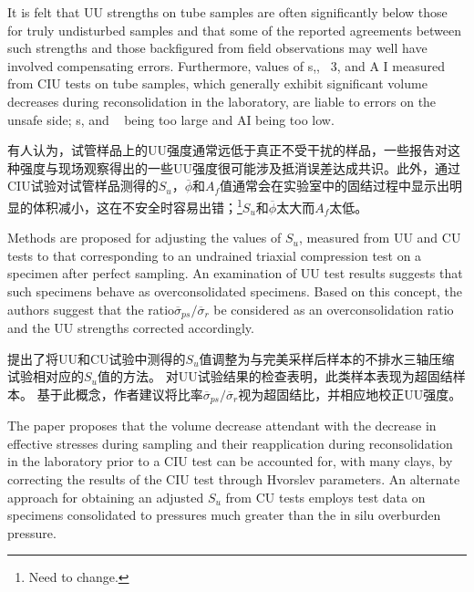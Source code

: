 \begin{paracol}{2}
    \switchcolumn*

    It is felt that UU strengths on tube samples are often significantly below those for truly undisturbed samples and that some of the reported agreements between such strengths and those backfigured from field observations may well have involved compensating errors. Furthermore, values of s,, ~3, and A I measured from CIU tests on tube samples, which generally exhibit significant volume decreases during reconsolidation in the laboratory, are liable to errors on the unsafe side; s, and ~ being too large and AI being too low.

    \switchcolumn

    有人认为，试管样品上的UU强度通常远低于真正不受干扰的样品，一些报告对这种强度与现场观察得出的一些UU强度很可能涉及抵消误差达成共识。此外，通过CIU试验对试管样品测得的$S_u$，$\overline{\phi}$和$A_f$值通常会在实验室中的固结过程中显示出明显的体积减小，这在不安全时容易出错；\footnote{
        Need to change.
    }$S_u$和$\overline{\phi}$太大而$A_f$太低。

    \switchcolumn*

    Methods are proposed for adjusting the values of $S_u$, measured from UU and CU tests to that corresponding to an undrained triaxial compression test on a specimen after perfect sampling. An examination of UU test results suggests that such specimens behave as overconsolidated specimens. Based on this concept, the authors suggest that the ratio ​​$\overline{\sigma}_{ps}/\overline{\sigma}_r$ be considered as an overconsolidation ratio and the UU strengths corrected accordingly.

    \switchcolumn

    提出了将UU和CU试验中测得的$S_u$值调整为与完美采样后样本的不排水三轴压缩试验相对应的$S_u$值的方法。 对UU试验结果的检查表明，此类样本表现为超固结样本。 基于此概念，作者建议将比率​​$\overline{\sigma}_{ps}/\overline{\sigma}_r$视为超固结比，并相应地校正UU强度。

    \switchcolumn*

    The paper proposes that the volume decrease attendant with the decrease in effective stresses during sampling and their reapplication during reconsolidation in the laboratory prior to a CIU test can be accounted for, with many clays, by correcting the results of the CIU test through Hvorslev parameters. An alternate approach for obtaining an adjusted $S_u$ from CU tests employs test data on specimens consolidated to pressures much greater than the in silu overburden pressure.


\end{paracol}
